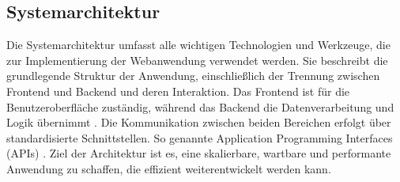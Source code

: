 \subsection{Systemarchitektur}
Die Systemarchitektur umfasst alle wichtigen Technologien und Werkzeuge, die zur Implementierung der Webanwendung verwendet werden. Sie beschreibt die grundlegende Struktur der Anwendung, einschließlich der Trennung zwischen Frontend und Backend und deren Interaktion. Das Frontend ist für die Benutzeroberfläche zuständig, während das Backend die Datenverarbeitung und Logik übernimmt \parencite{mccartney-2024}. Die Kommunikation zwischen beiden Bereichen erfolgt über standardisierte Schnittstellen. So genannte Application Programming Interfaces (APIs) \parencite{gazarov-2019}. Ziel der Architektur ist es, eine skalierbare, wartbare und performante Anwendung zu schaffen, die effizient weiterentwickelt werden kann.
